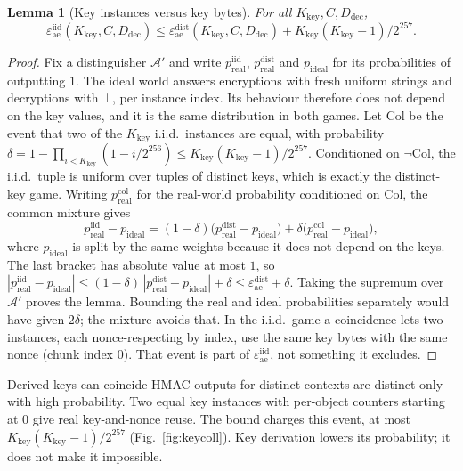 \documentclass[pdflatex,sn-mathphys-num]{sn-jnl}%
\theoremstyle{plain}
\newtheorem{lemma}[theorem]{Lemma}
\theoremstyle{definition}
\begin{document}
\begin{lemma}[Key instances versus key bytes]\label{lem:keycoll}
For all $K_{\mathrm{key}},C,D_{\mathrm{dec}}$,
\[
 \varepsilon^{\mathrm{iid}}_{\mathrm{ae}}(K_{\mathrm{key}},C,D_{\mathrm{dec}})\le\varepsilon^{\mathrm{dist}}_{\mathrm{ae}}(K_{\mathrm{key}},C,D_{\mathrm{dec}})+K_{\mathrm{key}}(K_{\mathrm{key}}-1)/2^{257}.
\]
\end{lemma}
\begin{proof}
Fix a distinguisher $\mathcal A'$ and write $p^{\mathrm{iid}}_{\mathrm{real}}$, $p^{\mathrm{dist}}_{\mathrm{real}}$ and $p_{\mathrm{ideal}}$ for its probabilities of outputting $1$. The ideal world answers encryptions with fresh uniform strings and decryptions with $\bot$, per instance index. Its behaviour therefore does not depend on the key values, and it is the same distribution in both games. Let $\mathrm{Col}$ be the event that two of the $K_{\mathrm{key}}$ i.i.d.\ instances are equal, with probability $\delta=1-\prod_{i<K_{\mathrm{key}}}(1-i/2^{256})\le K_{\mathrm{key}}(K_{\mathrm{key}}-1)/2^{257}$. Conditioned on $\neg\mathrm{Col}$, the i.i.d.\ tuple is uniform over tuples of distinct keys, which is exactly the distinct-key game. Writing $p^{\mathrm{col}}_{\mathrm{real}}$ for the real-world probability conditioned on $\mathrm{Col}$, the common mixture gives
\[
 p^{\mathrm{iid}}_{\mathrm{real}}-p_{\mathrm{ideal}}=(1-\delta)\big(p^{\mathrm{dist}}_{\mathrm{real}}-p_{\mathrm{ideal}}\big)+\delta\big(p^{\mathrm{col}}_{\mathrm{real}}-p_{\mathrm{ideal}}\big),
\]
where $p_{\mathrm{ideal}}$ is split by the same weights because it does not depend on the keys. The last bracket has absolute value at most $1$, so $|p^{\mathrm{iid}}_{\mathrm{real}}-p_{\mathrm{ideal}}|\le(1-\delta)\,|p^{\mathrm{dist}}_{\mathrm{real}}-p_{\mathrm{ideal}}|+\delta\le\varepsilon^{\mathrm{dist}}_{\mathrm{ae}}+\delta$. Taking the supremum over $\mathcal A'$ proves the lemma. Bounding the real and ideal probabilities separately would have given $2\delta$; the mixture avoids that. In the i.i.d.\ game a coincidence lets two instances, each nonce-respecting by index, use the same key bytes with the same nonce (chunk index $0$). That event is part of $\varepsilon^{\mathrm{iid}}_{\mathrm{ae}}$, not something it excludes.
\end{proof}

\begin{warnbox}{Derived keys can coincide}
HMAC outputs for distinct contexts are distinct only with high probability. Two equal key instances with per-object counters starting at $0$ give real key-and-nonce reuse. The bound charges this event, at most $K_{\mathrm{key}}(K_{\mathrm{key}}-1)/2^{257}$ (Fig.~\ref{fig:keycoll}). Key derivation lowers its probability; it does not make it impossible.
\end{warnbox}
\end{document}

